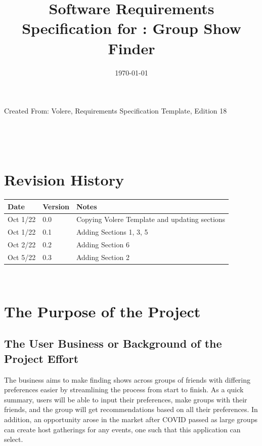\documentclass[12pt]{article}
\begin{document}
\title{Software Requirements Specification for \progname: Group Show Finder} 
\author{\authname}
\date{\today}
	
\maketitle
\vspace*{\fill}
Created From: Volere, Requirements Specification Template, Edition 18


~\newpage {}

\tableofcontents

~\newpage

\section*{Revision History}

\begin{tabularx}{\textwidth}{p{3cm}p{2cm}X}
\toprule {\bf Date} & {\bf Version} & {\bf Notes}\\
\midrule
Oct 1/22 & 0.0 & Copying Volere Template and updating sections\\
Oct 1/22 & 0.1 & Adding Sections 1, 3, 5\\
Oct 2/22 & 0.2 & Adding Section 6\\
Oct 5/22 & 0.3 & Adding Section 2\\
\bottomrule
\end{tabularx}

~\newpage {}

\section{The Purpose of the Project}

\subsection{The User Business or Background of the Project Effort}
The business aims to make finding shows across groups of friends with differing preferences easier by streamlining the process from start to finish. As a quick summary, users will be able to input their preferences, make groups with their friends, and the group will get recommendations based on all their preferences. In addition, an opportunity arose in the market after COVID passed as large groups can create host gatherings for any events, one such that this application can select.
\end{document}
